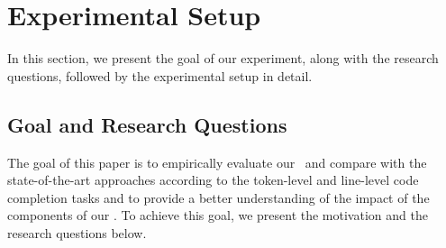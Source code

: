 \section{Experimental Setup}\label{sec:experiment}

In this section, we present the goal of our experiment, along with the research questions, followed by the experimental setup in detail.



\subsection{Goal and Research Questions}

The goal of this paper is to empirically evaluate our \our~and compare with the state-of-the-art approaches according to the token-level and line-level code completion tasks and to provide a better understanding of the impact of the components of our \our. 
To achieve this goal, we present the motivation and the research questions below.

